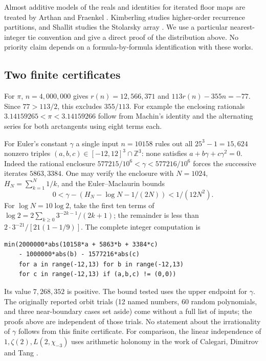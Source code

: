 \documentclass[11pt,letterpaper]{article}
\newcommand{\Z}{\mathbb Z}
\begin{document}
Almost additive models of the reals and identities for iterated floor maps
are treated by Arthan and Fraenkel \cite{arthan,fraenkel}. Kimberling
studies higher-order recurrence partitions, and Shallit studies the
Stolarsky array \cite{kimberling,shallit}. We use a particular nearest-integer tie
convention and give a direct proof of the distribution above. No
priority claim depends on a formula-by-formula identification with these works.

\subsection*{Two finite certificates}
For $\pi$, $n=4{,}000{,}000$ gives $r(n)=12{,}566{,}371$ and
$113r(n)-355n=-77$. Since $77>113/2$, this excludes $355/113$.
For example the enclosing rationals $3.14159265<\pi<3.14159266$ follow
from Machin's identity and the alternating series for both arctangents
using eight terms each.

For Euler's constant $\gamma$ a single input $n=10158$ rules out all
$25^3-1=15{,}624$ nonzero triples $(a,b,c)\in[-12,12]^3\cap\Z^3$:
none satisfies $a+b\gamma+c\gamma^2=0$. Indeed the rational enclosure
$577215/10^6<\gamma<577216/10^6$ forces the successive iterates
$5863,3384$. One may verify the enclosure with $N=1024$, $H_N=\sum_{k=1}^N1/k$,
and the Euler--Maclaurin bounds
\[
 0<\gamma-(H_N-\log N-1/(2N))<1/(12N^2).
\]
For $\log N=10\log2$, take the first ten terms of
$\log2=2\sum_{k\ge0}3^{-2k-1}/(2k+1)$; the remainder is less than
$2\cdot3^{-21}/[21(1-1/9)]$. The complete integer computation is
\begin{verbatim}
min(2000000*abs(10158*a + 5863*b + 3384*c)
    - 1000000*abs(b) - 1577216*abs(c)
    for a in range(-12,13) for b in range(-12,13)
    for c in range(-12,13) if (a,b,c) != (0,0))
\end{verbatim}
Its value $7{,}268{,}352$ is positive. The bound tested uses the
upper endpoint for $\gamma$. The originally reported orbit trials
(12 named numbers, 60 random polynomials, and three near-boundary cases
set aside) come without a full list of inputs; the proofs above are
independent of those trials. No statement about the irrationality of
$\gamma$ follows from this finite certificate. For comparison, the
linear independence of $1,\zeta(2),L(2,\chi_{-3})$ uses arithmetic
holonomy in the work of Calegari, Dimitrov and Tang \cite{cdt}.
\end{document}
